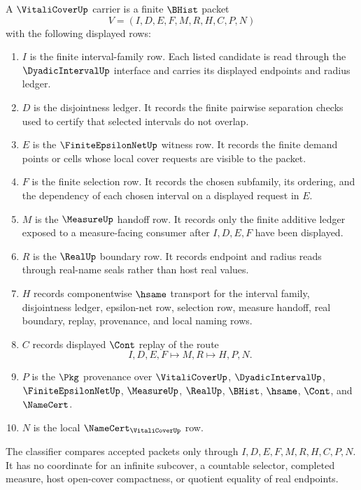 \begin{definition}
\label{def:vitali-cover-carrier}
A $\VitaliCoverUp$ carrier is a finite $\BHist$ packet
$$
V=(I,D,E,F,M,R,H,C,P,N)
$$
with the following displayed rows:
\begin{enumerate}
\item $I$ is the finite interval-family row. Each listed candidate is read through the $\DyadicIntervalUp$ interface and carries its displayed endpoints and radius ledger.
\item $D$ is the disjointness ledger. It records the finite pairwise separation checks used to certify that selected intervals do not overlap.
\item $E$ is the $\FiniteEpsilonNetUp$ witness row. It records the finite demand points or cells whose local cover requests are visible to the packet.
\item $F$ is the finite selection row. It records the chosen subfamily, its ordering, and the dependency of each chosen interval on a displayed request in $E$.
\item $M$ is the $\MeasureUp$ handoff row. It records only the finite additive ledger exposed to a measure-facing consumer after $I,D,E,F$ have been displayed.
\item $R$ is the $\RealUp$ boundary row. It records endpoint and radius reads through real-name seals rather than host real values.
\item $H$ records componentwise $\hsame$ transport for the interval family, disjointness ledger, epsilon-net row, selection row, measure handoff, real boundary, replay, provenance, and local naming rows.
\item $C$ records displayed $\Cont$ replay of the route
$$
I,D,E,F \longmapsto M,R \longmapsto H,P,N .
$$
\item $P$ is the $\Pkg$ provenance over $\VitaliCoverUp$, $\DyadicIntervalUp$, $\FiniteEpsilonNetUp$, $\MeasureUp$, $\RealUp$, $\BHist$, $\hsame$, $\Cont$, and $\NameCert$.
\item $N$ is the local $\NameCert_{\VitaliCoverUp}$ row.
\end{enumerate}
The classifier compares accepted packets only through $I,D,E,F,M,R,H,C,P,N$. It has no coordinate for an infinite subcover, a countable selector, completed measure, host open-cover compactness, or quotient equality of real endpoints.
\end{definition}

